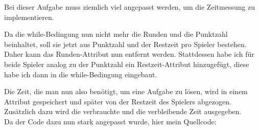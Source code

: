 \documentclass{scrartcl}   %
\begin{document}
Bei dieser Aufgabe muss ziemlich viel angepasst werden, um die Zeitmessung zu implementieren.

Da die while-Bedingung nun nicht mehr die Runden und die Punktzahl beinhaltet, soll sie jetzt aus Punktzahl und der Restzeit pro Spieler bestehen. Daher kann das Runden-Attribut nun entfernt werden. Stattdessen habe ich für beide Spieler analog zu der Punktzahl ein Restzeit-Attribut hinzugefügt, diese habe ich dann in die while-Bedingung eingebaut.

Die Zeit, die man nun also benötigt, um eine Aufgabe zu lösen, wird in einem Attribut gespeichert und später von der Restzeit des Spielers abgezogen. Zusätzlich dazu wird die verbrauchte und die verbleibende Zeit ausgegeben.\\

Da der Code dazu nun  stark angepasst wurde, hier mein Quellcode:\\
\end{document}
